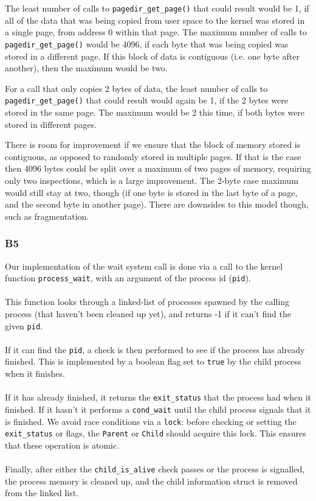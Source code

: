 \documentclass[a4wide, 11pt]{article}
\newcommand{\tx}{\texttt}
\begin{document}
The least number of calls to \tx{pagedir\_get\_page()} that could result would be 1, if all of the data that was being copied from user space to the kernel was stored in a single page, from address 0 within that page. The maximum number of calls to \tx{pagedir\_get\_page()} would be 4096, if each byte that was being copied was stored in a different page. If this block of data is contiguous (i.e. one byte after another), then the maximum would be two.

For a call that only copies 2 bytes of data, the least number of calls to \tx{pagedir\_get\_page()} that could result would again be 1, if the 2 bytes were stored in the same page. The maximum would be 2 this time, if both bytes were stored in different pages.

There is room for improvement if we ensure that the block of memory stored is contiguous, as opposed to randomly stored in multiple pages. If that is the case then 4096 bytes could be split over a maximum of two pages of memory, requiring only two inspections, which is a large improvement. The 2-byte case maximum would still stay at two, though (if one byte is stored in the last byte of a page, and the second byte in another page). There are downsides to this model though, such as fragmentation.

\subsubsection{B5}


Our implementation of the wait system call is done via a call to the kernel function \texttt{process\_wait}, with an argument of the process id (\texttt{pid}).
\\\\
This function looks through a linked-list of processes spawned by the calling process (that haven't been cleaned up yet), and returns -1 if it can't find the given \texttt{pid}.
\\\\
If it can find the \texttt{pid}, a check is then performed to see if the process has already finished. This is implemented by a boolean flag set to \texttt{true} by the child process when it finishes. \\\\
If it has already finished, it returns the \texttt{exit\_status} that the process had when it finished. If it hasn't it performs a \texttt{cond\_wait} until the child process signals that it is finished. We avoid race conditions via a \texttt{lock}: before checking or setting the \tx{exit\_status} or flags, the \tx{Parent} or \tx{Child} should acquire this lock. This ensures that these operation is atomic.
\\\\
Finally, after either the \texttt{child\_is\_alive} check passes or the process is signalled, the process memory is cleaned up, and the child information struct is removed from the linked list.
\end{document}
